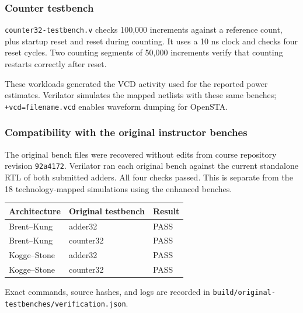 \documentclass[10pt,letterpaper]{article}
\begin{document}
\subsubsection{Counter testbench}
\texttt{counter32-testbench.v} checks 100,000 increments against a reference
count, plus startup reset and reset during counting. It uses a 10 ns clock
and checks four reset cycles. Two counting segments of 50,000 increments
verify that counting restarts correctly after reset.

These workloads generated the VCD activity used for the reported power
estimates. Verilator simulates the mapped netlists with these same benches;
\texttt{+vcd=filename.vcd} enables waveform dumping for OpenSTA.


\subsubsection{Compatibility with the original instructor benches}

The original bench files were recovered without edits from course repository revision \texttt{92a4172}. Verilator ran each original bench against the current standalone RTL of both submitted adders. All four checks passed. This is separate from the 18 technology-mapped simulations using the enhanced benches.

\begin{center}\small
\begin{tabular}{lll}
\toprule
Architecture & Original testbench & Result \\
\midrule
Brent--Kung & adder32 & PASS \\
Brent--Kung & counter32 & PASS \\
Kogge--Stone & adder32 & PASS \\
Kogge--Stone & counter32 & PASS \\
\bottomrule
\end{tabular}
\end{center}

Exact commands, source hashes, and logs are recorded in \texttt{build/original-testbenches/verification.json}.
\end{document}
